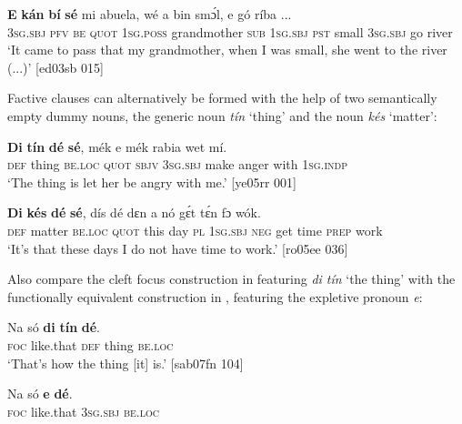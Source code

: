 \ea%
    \label{ex:key:1135}
    \gll \textbf{E}    \textbf{kán}  \textbf{bí}  \textbf{sé}    mi    abuela,    wé  a
bin  smɔ́l,  e    gó  ríba    \op...\cp{}\\
\textsc{3sg.sbj}  \textsc{pfv}  \textsc{be}  \textsc{quot}    \textsc{1sg.poss}  grandmother  \textsc{sub}  \textsc{1sg.sbj}
\textsc{pst}  small  \textsc{3sg.sbj}  go  river\\

\glt ‘It came to pass that my grandmother, when I was small, 
she went to the river (...)’ [ed03sb 015]
\z

Factive clauses can alternatively be formed with the help of two semantically empty dummy nouns, the generic noun \textit{tín} ‘thing’ and the noun \textit{kés} ‘matter’:


\ea%
    \label{ex:key:1136}
    \gll \textbf{Di}  \textbf{tín}    \textbf{dé}    \textbf{sé},    mék    e    mék    rabia  wet    mí.\\
\textsc{def}  thing  \textsc{be.loc}  \textsc{quot}    \textsc{sbjv}    \textsc{3sg.sbj}  make  anger  with    \textsc{1sg.indp}\\

\glt ‘The thing is let her be angry with me.’ [ye05rr 001]
\z


\ea%
    \label{ex:key:1137}
    \gll \textbf{Di}  \textbf{kés}    \textbf{dé}    \textbf{sé},    dís  dé  dɛn  a    nó  gɛ́t  tɛ́n
fɔ  wók.\\
\textsc{def}  matter  \textsc{be.loc}  \textsc{quot}    this  day  \textsc{pl}  \textsc{1sg.sbj}  \textsc{neg}  get  time
\textsc{prep}  work\\
\glt ‘It’s that these days I do not have time to work.’ [ro05ee 036]
\z

Also compare the cleft focus construction in  featuring \textit{di tín} ‘the thing’ with the functionally equivalent construction in , featuring the expletive pronoun \textit{e}:


\ea%
    \label{ex:key:1138}
    \gll Na  só    \textbf{di}  \textbf{tín}    \textbf{dé}.\\
\textsc{foc}  like.that  \textsc{def}  thing  \textsc{be.loc}\\

\glt ‘That’s how the thing [it] is.’ [sab07fn 104]
\z


\ea%
    \label{ex:key:1139}
    \gll Na  só    \textbf{e}    \textbf{dé}.\\
\textsc{foc}  like.that  \textsc{3sg.sbj}  \textsc{be.loc}\\

